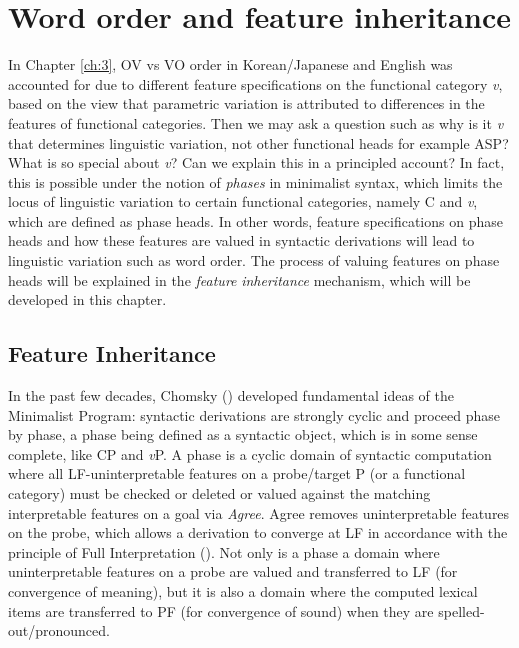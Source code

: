 \chapter{Word order and feature inheritance}\label{ch:4}

In Chapter \ref{ch:3}, \ac{OV} vs \ac{VO} order in Korean/Japanese and English was accounted for due to different feature specifications on the functional category \textit{v}, based on the view that parametric variation is attributed to differences in the features of functional categories. Then we may ask a question such as why is it \textit{v} that determines linguistic variation, not other functional heads for example \ac{ASP}? What is so special about \textit{v}? Can we explain this in a principled account? In fact, this is possible under the notion of \textit{phases} in minimalist syntax, which limits the locus of linguistic variation to certain functional categories, namely C and \textit{v}, which are defined as phase heads. In other words, feature specifications on phase heads and how these features are valued in syntactic derivations will lead to linguistic variation such as word order. The process of valuing features on phase heads will be explained in the \textit{feature} \textit{inheritance} mechanism, which will be developed in this chapter. 

\section{Feature Inheritance}\label{ch4:section:4.1}

In the past few decades, Chomsky (\citeyear{Chomsky2000,Chomsky2001,Chomsky2006,Chomsky2008}) developed fundamental ideas of the Minimalist Program: syntactic derivations are strongly cyclic and proceed phase by phase, a phase being defined as a syntactic object, which is in some sense complete, like \ac{CP} and \textit{v}P. A phase is a cyclic domain of syntactic computation where all \ac{LF}-uninterpretable features on a probe/target P (or a functional category) must be checked or deleted or valued against the matching interpretable features on a goal via \textit{Agree}. Agree removes uninterpretable features on the probe, which allows a derivation to converge at \ac{LF} in accordance with the principle of Full Interpretation (\citealt{Chomsky1986,Chomsky1995}). Not only is a phase a domain where uninterpretable features on a probe are valued and transferred to \ac{LF} (for convergence of meaning), but it is also a domain where the computed lexical items are transferred to \ac{PF} (for convergence of sound) when they are spelled-out/pronounced.


